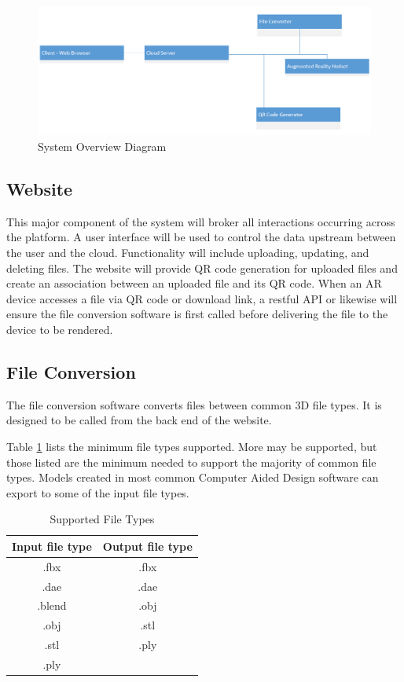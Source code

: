 \begin{figure}[H]
	\centering
	\includegraphics[width=\textwidth]{UMLSystemOverview.png}
	\caption{System Overview Diagram} 
	\label{UMLSystemOverview}	
\end{figure}

\subsection{Website}

This major component of the system will broker all interactions occurring across the platform. A user interface will be used to control the data upstream between the user and the cloud. Functionality will include uploading, updating, and deleting files. The website will provide QR code generation for uploaded files and create an association between an uploaded file and its QR code. When an AR device accesses a file via QR code or download link, a restful API or likewise will ensure the file conversion software is first called before delivering the file to the device to be rendered.  

\subsection{File Conversion}
The file conversion software converts files between common 3D file types. It is designed to be called from the back end of the website.

Table \ref{table:suportedfiletypes} lists the minimum file types supported.  More may be supported, but those listed are the minimum needed to support the majority of common file types.  
Models created in most common Computer Aided Design software can export to some of the input file types.

\begin{table}[!h]
    \centering
    \begin{tabular}{| c | c |}
        \hline
        Input file type & Output file type \\
        \hline
        .fbx & .fbx \\
        .dae & .dae \\
        .blend & .obj \\ 
        .obj & .stl \\
        .stl & .ply \\
        .ply & \\
        \hline
    \end{tabular}
    \caption{Supported File Types}
    \label{table:suportedfiletypes}
\end{table}

